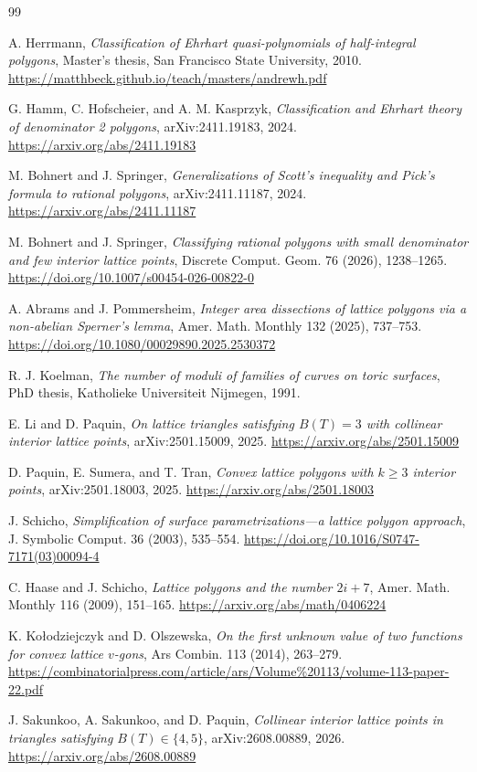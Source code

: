 \documentclass[11pt]{article}
\theoremstyle{remark}
\numberwithin{equation}{section}
\begin{document}
\begin{thebibliography}{99}

A. Herrmann,
\emph{Classification of Ehrhart quasi-polynomials of half-integral polygons},
Master's thesis, San Francisco State University, 2010.
\url{https://matthbeck.github.io/teach/masters/andrewh.pdf}

G. Hamm, C. Hofscheier, and A. M. Kasprzyk,
\emph{Classification and Ehrhart theory of denominator 2 polygons},
arXiv:2411.19183, 2024.
\url{https://arxiv.org/abs/2411.19183}

M. Bohnert and J. Springer,
\emph{Generalizations of Scott's inequality and Pick's formula to rational polygons},
arXiv:2411.11187, 2024.
\url{https://arxiv.org/abs/2411.11187}

M. Bohnert and J. Springer,
\emph{Classifying rational polygons with small denominator and few interior lattice points},
Discrete Comput. Geom. 76 (2026), 1238--1265.
\url{https://doi.org/10.1007/s00454-026-00822-0}

A. Abrams and J. Pommersheim,
\emph{Integer area dissections of lattice polygons via a non-abelian Sperner's lemma},
Amer. Math. Monthly 132 (2025), 737--753.
\url{https://doi.org/10.1080/00029890.2025.2530372}

R. J. Koelman,
\emph{The number of moduli of families of curves on toric surfaces},
PhD thesis, Katholieke Universiteit Nijmegen, 1991.

E. Li and D. Paquin,
\emph{On lattice triangles satisfying $B(T)=3$ with collinear interior lattice points},
arXiv:2501.15009, 2025.
\url{https://arxiv.org/abs/2501.15009}

D. Paquin, E. Sumera, and T. Tran,
\emph{Convex lattice polygons with $k\geq3$ interior points},
arXiv:2501.18003, 2025.
\url{https://arxiv.org/abs/2501.18003}

J. Schicho,
\emph{Simplification of surface parametrizations---a lattice polygon approach},
J. Symbolic Comput. 36 (2003), 535--554.
\url{https://doi.org/10.1016/S0747-7171(03)00094-4}

C. Haase and J. Schicho,
\emph{Lattice polygons and the number $2i+7$},
Amer. Math. Monthly 116 (2009), 151--165.
\url{https://arxiv.org/abs/math/0406224}

K. Ko\l odziejczyk and D. Olszewska,
\emph{On the first unknown value of two functions for convex lattice $v$-gons},
Ars Combin. 113 (2014), 263--279.
\url{https://combinatorialpress.com/article/ars/Volume%20113/volume-113-paper-22.pdf}

J. Sakunkoo, A. Sakunkoo, and D. Paquin,
\emph{Collinear interior lattice points in triangles satisfying $B(T)\in\{4,5\}$},
arXiv:2608.00889, 2026.
\url{https://arxiv.org/abs/2608.00889}

\end{thebibliography}
\end{document}
